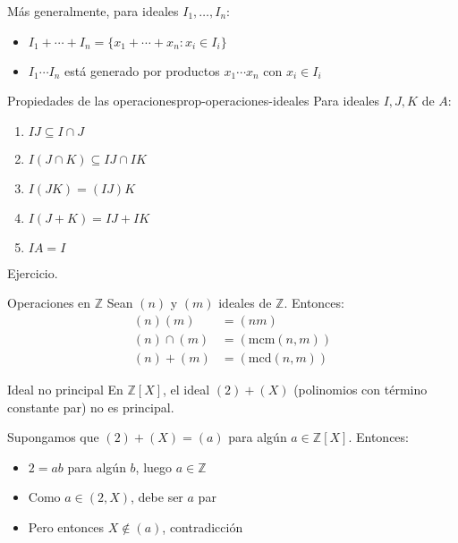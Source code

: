 \begin{remark}
    Más generalmente, para ideales \(I_1, \ldots, I_n\):
    \begin{itemize}
        \item \(I_1 + \cdots + I_n = \{x_1 + \cdots + x_n : x_i \in I_i\}\)
        \item \(I_1 \cdots I_n\) está generado por productos \(x_1 \cdots x_n\) con \(x_i \in I_i\)
    \end{itemize}
\end{remark}

\begin{proposition}{Propiedades de las operaciones}{prop-operaciones-ideales}
    Para ideales \(I, J, K\) de \(A\):
    \begin{enumerate}
        \item \(IJ \subseteq I \cap J\)
        \item \(I(J \cap K) \subseteq IJ \cap IK\)
        \item \(I(JK) = (IJ)K\)
        \item \(I(J + K) = IJ + IK\)
        \item \(IA = I\)
    \end{enumerate}
\end{proposition}

\begin{proofbox}
    Ejercicio.
\end{proofbox}

\begin{example}{Operaciones en \(\mathbb{Z}\)}{}
    Sean \((n)\) y \((m)\) ideales de \(\mathbb{Z}\). Entonces:
    \begin{align*}
        (n)(m) &= (nm) \\
        (n) \cap (m) &= (\mathrm{mcm}(n, m)) \\
        (n) + (m) &= (\mathrm{mcd}(n, m))
    \end{align*}
\end{example}

\begin{example}{Ideal no principal}{}
    En \(\mathbb{Z}[X]\), el ideal \((2) + (X)\) (polinomios con término constante par) no es principal.
\end{example}

\begin{proofbox}
    Supongamos que \((2) + (X) = (a)\) para algún \(a \in \mathbb{Z}[X]\). Entonces:
    \begin{itemize}
        \item \(2 = ab\) para algún \(b\), luego \(a \in \mathbb{Z}\)
        \item Como \(a \in (2, X)\), debe ser \(a\) par
        \item Pero entonces \(X \notin (a)\), contradicción
    \end{itemize}
\end{proofbox}

